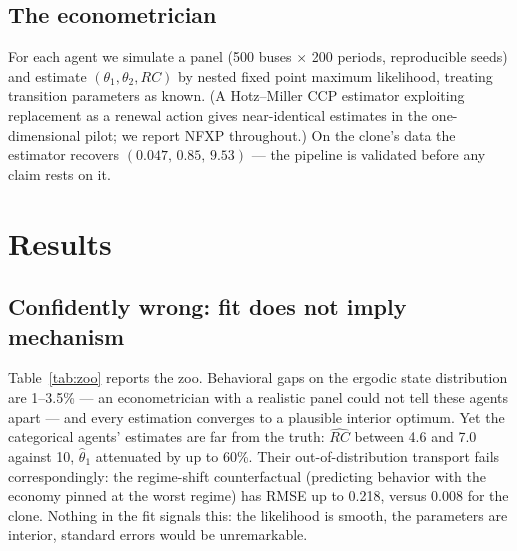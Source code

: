 \documentclass[11pt]{article}
\newcommand{\rhat}{\widehat{RC}}
\newcommand{\that}[1]{\widehat{\theta}_{#1}}
\begin{document}
\subsection{The econometrician}
For each agent we simulate a panel (500 buses $\times$ 200 periods,
reproducible seeds) and estimate $(\theta_1, \theta_2, RC)$ by nested
fixed point maximum likelihood, treating transition parameters as known.
(A Hotz--Miller CCP estimator exploiting replacement as a renewal action
gives near-identical estimates in the one-dimensional pilot; we report
NFXP throughout.) On the clone's data the estimator recovers
$(0.047,\, 0.85,\, 9.53)$ --- the pipeline is validated before any claim
rests on it.

\section{Results}\label{sec:results}

\subsection{Confidently wrong: fit does not imply mechanism}
\label{sec:wrong}
Table~\ref{tab:zoo} reports the zoo. Behavioral gaps on the ergodic state
distribution are 1--3.5\% --- an econometrician with a realistic panel could
not tell these agents apart --- and every estimation converges to a
plausible interior optimum. Yet the categorical agents' estimates are far
from the truth: $\rhat$ between 4.6 and 7.0 against 10, $\that{1}$
attenuated by up to 60\%. Their out-of-distribution transport fails
correspondingly: the regime-shift counterfactual (predicting behavior with
the economy pinned at the worst regime) has RMSE up to 0.218, versus 0.008
for the clone. Nothing in the fit signals this: the likelihood is smooth,
the parameters are interior, standard errors would be unremarkable.
\end{document}
